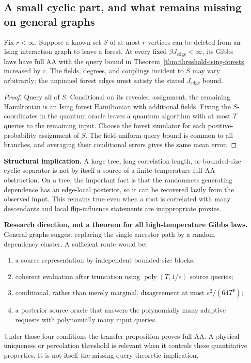 \subsection{A small cyclic part, and what remains missing on general graphs}
\label{sec:threshold-positive-scope}

\begin{corollary}
\label{cor:threshold-feedback-sets}
Fix \(r<\infty\). Suppose a known set \(S\) of at most \(r\) vertices can be deleted
from an Ising interaction graph to leave a forest. At every fixed
\(\beta J_{\mathrm{edge}}<\infty\), its Gibbs laws have full AA with the query
bound in Theorem~\ref{thm:threshold-ising-forests} increased by \(r\).
The fields, degrees, and couplings incident to \(S\) may vary
arbitrarily; the unpinned forest edges must satisfy the stated
\(J_{\mathrm{edge}}\) bound.
\end{corollary}

\begin{proof}
Query all of \(S\). Conditional on its revealed assignment, the
remaining Hamiltonian is an Ising forest Hamiltonian with additional
fields. Fixing the \(S\)-coordinates in the quantum oracle leaves a
quantum algorithm with at most \(T\) queries to the remaining input.
Choose the forest simulator for each positive-probability assignment
of \(S\). The field-uniform query bound is common to all branches,
and averaging their conditional errors gives the same mean error.
\end{proof}

\textbf{Structural implication.} A large tree, long correlation length,
or bounded-size cyclic separator is not by itself a source of a
finite-temperature full-AA obstruction. On a tree, the important fact
is that the randomness generating dependence has an edge-local
posterior, so it can be recovered lazily from the observed input. This
remains true even when a root is correlated with many descendants and
local flip-influence statements are inappropriate proxies.

\textbf{Research direction, not a theorem for all high-temperature
Gibbs laws.} General graphs suggest replacing the single ancestor
path by a random dependency cluster. A sufficient route would be:
\begin{enumerate}
\item a source representation by independent bounded-size blocks;
\item coherent evaluation after truncation using
\(\operatorname{poly}(T,1/e)\) source queries;
\item conditional, rather than merely marginal, disagreement at most
\(e^2/(64T^2)\);
\item a posterior source oracle that answers the polynomially many
adaptive requests with polynomially many input queries.
\end{enumerate}
Under those four conditions the transfer proposition proves full AA.
A physical uniqueness or percolation threshold is relevant when it
controls these quantitative properties. It is not itself the missing
query-theoretic implication.

